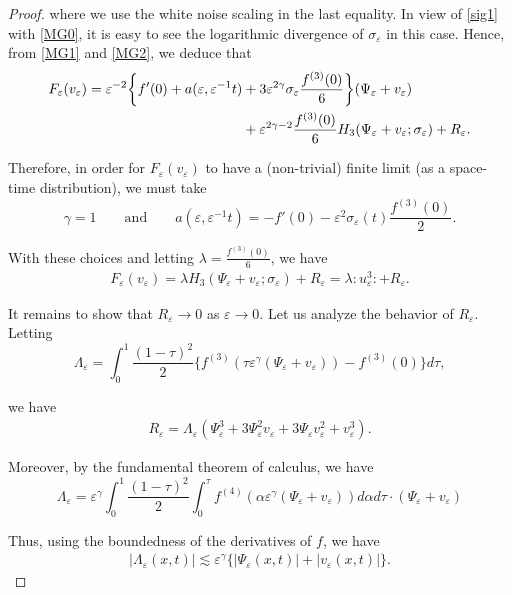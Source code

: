 \documentclass[letterpaper, 11pt,  reqno]{amsart}
\newcommand{\1}{\hspace{0.5mm}\text{I}\hspace{0.5mm}}
\newcommand{\noi}{\noindent}
\newcommand{\al}{\alpha}
\newcommand{\eps}{\varepsilon}
\newcommand{\g}{\gamma}
\newcommand{\ld}{\lambda}
\newcommand{\Ld}{\Lambda}
\newcommand{\s}{\sigma}
\newcommand{\les}{\lesssim}
\numberwithin{equation}{section}
\numberwithin{theorem}{section}
\begin{document}
\begin{proof}
{\noi
where we use the white noise scaling in the last equality.
In view of \eqref{sig1} with \eqref{MG0}, it is easy to see 
the logarithmic divergence of $\s_\eps$ in this case.}
Hence, from \eqref{MG1} and \eqref{MG2}, we deduce that 
\begin{align*}
 F_{\eps} (v_{\eps}) = \eps^{- 2} \bigg\{ f' (0) + a (\eps, \eps^{-1} t) 
 & + 3 \eps^{2 \gamma} \sigma_{\eps}
\frac{f^{(3)} (0)}{6} \bigg\} (\Psi_{\eps} + v_{\eps}) \notag\\ 
& +\eps^{2 \gamma - 2}  \frac{f^{(3)} (0)}{6} H_3 (\Psi_{\eps} +v_{\eps}; \sigma_{\eps}) + R_{\eps}. 
\end{align*}

\noi
Therefore,  in order for $F_{\eps} (v_{\eps})$ to have a (non-trivial) 
finite limit (as a space-time distribution),  we must take
\[ \g = 1
   \qquad \text{and}\qquad 
   a (\eps, \eps^{-1} t) = - f' (0) - \eps^{2}
   \sigma_{\eps} (t) \frac{f^{(3)} (0)}{2}. \]


\noi
With these choices and letting 
$\ld =\frac{f^{(3)} (0)}{6} $,  we have
\begin{align*}
 F_{\eps} (v_{\eps}) 
= \lambda H_3 (\Psi_{\eps} +   v_{\eps}; \sigma_{\eps}) + R_\eps
 = \ld  :\! u_\eps^3\!: + R_\eps. 
\end{align*}


It remains to show that $R_\eps \to 0$ as $\eps \to 0$.
Let us analyze the behavior of $R_{\eps}$. Letting
\[ \Ld_\eps = \int_0^1 \frac{(1 - \tau)^2}{2}  \big\{f^{(3)} (\tau
   \eps^\g (\Psi_{\eps} + v_{\eps})) - f^{(3)} (0)\big\}
d \tau, \]

\noi
we have
\begin{align}
	 R_{\eps} = \Lambda_{\eps}  (\Psi_{\eps}^3 + 3
   \Psi_{\eps}^2 v_{\eps} + 3 \Psi_{\eps}
   v_{\eps}^2 + v_{\eps}^3). 
\label{MG4}
\end{align}

\noi
Moreover, by the fundamental theorem of calculus, we have
\[ \Ld_\eps = \eps^\g \int_0^1 \frac{(1 -   \tau)^2}{2} 
\int_0^\tau f^{(4)} (\al  \eps^{\gamma} (\Psi_{\eps} +   v_{\eps}))d\al d \tau 
\cdot (\Psi_{\eps} + v_{\eps}) \]

\noi
Thus, using the boundedness of the derivatives of $f$,  we have
\begin{align} 
| \Ld_\eps (x, t) | \les \eps^{\gamma} 
\big\{|    \Psi_{\eps} (x, t) | + | v_{\eps} (x, t) |\big\} . 
\label{MG5}
\end{align}



\end{proof}
\end{document}
